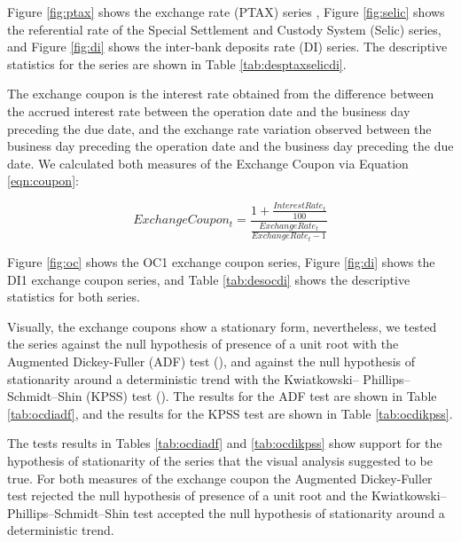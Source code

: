 \documentclass[cic,tc, english]{iiufrgs}
\begin{document}
    Figure \ref{fig:ptax} shows the exchange rate (PTAX) series , Figure \ref{fig:selic} shows the referential rate of the Special Settlement and Custody System (Selic) series, and Figure \ref{fig:di} shows the inter-bank deposits rate (DI) series. The descriptive statistics for the series are shown in Table \ref{tab:desptaxselicdi}.

    

    

    

    

    The exchange coupon is the interest rate obtained from the difference between the accrued interest rate between the operation date and the business day preceding the due date, and the exchange rate variation observed between the business day preceding the operation date and the business day preceding the due date. We calculated both measures of the Exchange Coupon via Equation \ref{eqn:coupon}:

    \begin{equation}
        \label{eqn:coupon}
        ExchangeCoupon_t = \frac{1 + \frac{InterestRate_t}{100}}{\frac{ExchangeRate_t}{ExchangeRate_t-1}}
    \end{equation}

    Figure \ref{fig:oc} shows the OC1 exchange coupon series, Figure \ref{fig:di} shows the DI1 exchange coupon series, and Table \ref{tab:desocdi} shows the descriptive statistics for both series.

    

    

    

    Visually, the exchange coupons show a stationary form, nevertheless, we tested the series against the null hypothesis of presence of a unit root with the Augmented Dickey-Fuller (ADF) test (\citet{adf}), and against the null hypothesis of stationarity around a deterministic trend with the Kwiatkowski– Phillips–Schmidt–Shin (KPSS) test (\citet{kpss}). The results for the ADF test are shown in Table \ref{tab:ocdiadf}, and the results for the KPSS test are shown in Table \ref{tab:ocdikpss}.

    

    

    The tests results in Tables \ref{tab:ocdiadf} and \ref{tab:ocdikpss} show support for the hypothesis of stationarity of the series that the visual analysis suggested to be true. For both measures of the exchange coupon the Augmented Dickey-Fuller test rejected the null hypothesis of presence of a unit root and the Kwiatkowski– Phillips–Schmidt–Shin test accepted the null hypothesis of stationarity around a deterministic trend.
    
\end{document}
